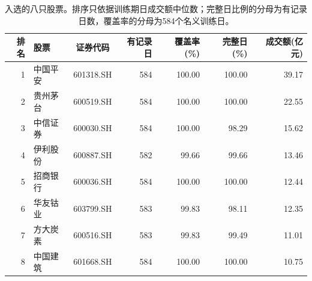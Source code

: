 \begin{table}[!htbp]\centering\small
\caption{入选的八只股票。排序只依据训练期日成交额中位数；完整日比例的分母为有记录日数，覆盖率的分母为584个名义训练日。}
\label{tab:selected_stocks}
\begin{tabular}{rlcrrrr}\toprule
排名 & 股票 & 证券代码 & 有记录日 & 覆盖率(\%) & 完整日(\%) & 成交额(亿元)\\\midrule
1 & 中国平安 & 601318.SH & 584 & 100.00 & 100.00 & 39.17\\
2 & 贵州茅台 & 600519.SH & 584 & 100.00 & 100.00 & 22.55\\
3 & 中信证券 & 600030.SH & 584 & 100.00 & 98.29 & 15.62\\
4 & 伊利股份 & 600887.SH & 582 & 99.66 & 99.66 & 13.46\\
5 & 招商银行 & 600036.SH & 584 & 100.00 & 100.00 & 12.44\\
6 & 华友钴业 & 603799.SH & 583 & 99.83 & 98.11 & 12.35\\
7 & 方大炭素 & 600516.SH & 583 & 99.83 & 99.49 & 11.01\\
8 & 中国建筑 & 601668.SH & 584 & 100.00 & 100.00 & 10.75\\
\bottomrule\end{tabular}\end{table}
